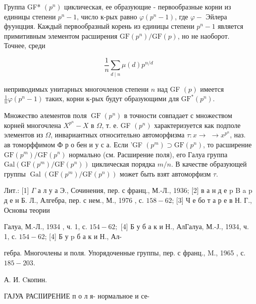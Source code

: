 \documentclass[10pt]{article}
\begin{document}
Группа GF* $\left(p^{n}\right)$ циклическая, ее образующие - первообразные корни из единицы степени $p^{n}-1$, число к-рых равно $\varphi\left(p^{n}-1\right)$, где $\varphi-$ Эйлера фуунцция. Каждый первообразный корень из единицы степени $p^{n}-1$ является примитивным элементом расширения $\mathrm{GF}\left(p^{n}\right) / \mathrm{GF}(p)$, но не наоборот. Точнее, среди



\[

\frac{1}{n} \sum_{d \mid n} \mu(d) p^{n / d}

\]



неприводимых унитарных многочленов степени $n$ над GF $(p)$ имеется $\frac{1}{n} \varphi\left(p^{n}-1\right)$ таких, корни к-рых будут образующими для $\mathrm{GF}^{*}\left(p^{n}\right)$.



Множество әлементов поля $\operatorname{GF}\left(p^{n}\right)$ в точности совпадает с множеством корней многочлена $X^{p^{n}}-X$ в $\Omega$, т. е. GF $\left(p^{n}\right)$ характеризуется как подполе элементов из $\Omega$, инвариантных относительно автоморфизма $\tau: x \rightarrow$ $\rightarrow x^{p^{n}}$, наз. ав томорффимом Ф р о бен и у с а. Если 'GF $\left(p^{m}\right) \supset \mathrm{GF}\left(p^{n}\right)$, то расширение $\mathrm{GF}\left(p^{m}\right) / \mathrm{GF}\left(p^{n}\right)$ нормально (см. Расширение поля), его Галуа группа $\mathrm{Gal}\left(\mathrm{GF}\left(p^{m}\right) / \mathrm{GF}\left(p^{n}\right)\right)$ циклическая порядка $m / n$. В качестве образующей группы $\operatorname{Gal}\left(\mathrm{GF}\left(p^{m}\right) / \mathrm{GF}\left(p^{n}\right)\right)$ может быть взят автоморфизм $\tau$.



Лит.: [1] $\Gamma$ а л у а Э., Сочинения, пер. с франц., М.-Л., 1936; [2] в а н д е p B a p д е н Б. Л., Алгебра, пер. с нем., М., 1976 , с. $158-62$; [3] Ч е бо т а р е в Н. Г., Основы теории

Галуа, М.-Л., 1934 , ч. 1, с. $154-62 ;$ [4] Б у б а к и Н., АлГалуа, М.-Ј., 1934, ч. 1, с. $154-62$; [4] Б у $\mathrm{p}$ б а к и Н., Ал-

гебра. Многочлены и поля. Упорядоченные группы, пер. с франц., M., 1965 , с. $185-203$.



А. И. Cкопин.



ГАЈУА РАСІІИРЕНИЕ п о л я- нормальное и се-
\end{document}
